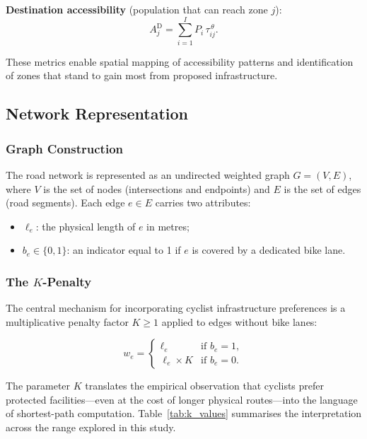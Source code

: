 \documentclass[12pt,a4paper]{article}
\begin{document}
\textbf{Destination accessibility} (population that can reach zone $j$):
\begin{equation}
A_j^{\mathrm{D}} = \sum_{i=1}^{I} P_i \, \tau_{ij}^{\,\theta}.
\label{eq:dest_acc}
\end{equation}

These metrics enable spatial mapping of accessibility patterns and identification of zones that stand to gain most from proposed infrastructure.

\subsection{Network Representation}
\label{sec:network}

\subsubsection{Graph Construction}

The road network is represented as an undirected weighted graph $G = (V, E)$, where $V$ is the set of nodes (intersections and endpoints) and $E$ is the set of edges (road segments). Each edge $e \in E$ carries two attributes:

\begin{itemize}[leftmargin=*,nosep]
    \item $\ell_e$: the physical length of $e$ in metres;
    \item $b_e \in \{0, 1\}$: an indicator equal to 1 if $e$ is covered by a dedicated bike lane.
\end{itemize}

\subsubsection{The $K$-Penalty}

The central mechanism for incorporating cyclist infrastructure preferences is a multiplicative penalty factor $K \geq 1$ applied to edges without bike lanes:

\begin{equation}
w_e =
\begin{cases}
\ell_e & \text{if } b_e = 1, \\[4pt]
\ell_e \times K & \text{if } b_e = 0.
\end{cases}
\label{eq:k_penalty}
\end{equation}

The parameter $K$ translates the empirical observation that cyclists prefer protected facilities---even at the cost of longer physical routes---into the language of shortest-path computation. Table~\ref{tab:k_values} summarises the interpretation across the range explored in this study.
\end{document}
